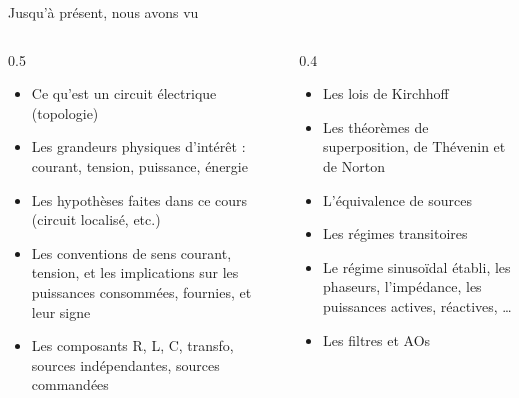 \titleframe





\begin{frame}{Jusqu’à présent, nous avons vu}
    \begin{columns}
  \begin{column}{0.5\textwidth}  
    \begin{itemize}
        \item Ce qu’est un circuit électrique (topologie)
        \item Les grandeurs physiques d’intérêt : courant, tension, puissance, énergie
        \item Les hypothèses faites dans ce cours (circuit localisé, etc.)
        \item Les conventions de sens courant, tension, et les implications sur les puissances consommées, fournies, et leur signe
        \item Les composants R, L, C, transfo, sources indépendantes, sources commandées
    \end{itemize}
  \end{column}
  \begin{column}{0.4\textwidth}
    \begin{itemize}
        \item Les lois de Kirchhoff
        \item Les théorèmes de superposition, de Thévenin et de Norton
        \item L’équivalence de sources
        \item Les régimes transitoires
        \item Le régime sinusoïdal établi, les phaseurs, l’impédance, les puissances actives, réactives, …
        \item Les filtres et AOs
    \end{itemize}
\end{column}
\end{columns}
\end{frame}

